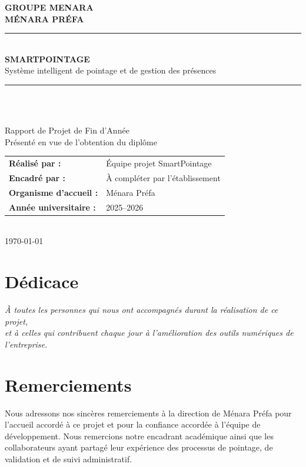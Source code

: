 \documentclass[11pt,a4paper,oneside]{report}
\newcommand{\menara}{Ménara Préfa}
\begin{document}
\begin{titlepage}
\centering
\vspace*{1.2cm}
{\Large\bfseries GROUPE MENARA}\\[0.2cm]
{\large\bfseries MÉNARA PRÉFA}\\[1.5cm]
\rule{\textwidth}{1.2pt}\\[0.5cm]
{\Huge\bfseries\textcolor{menaranavy}{SMARTPOINTAGE}}\\[0.35cm]
{\Large Système intelligent de pointage et de gestion des présences}\\[0.5cm]
\rule{\textwidth}{1.2pt}\\[1.8cm]
\\[1.8cm]
{\large Rapport de Projet de Fin d'Année}\\[0.3cm]
{\large Présenté en vue de l'obtention du diplôme}\\[1.4cm]
\begin{tabular}{>{\bfseries}p{5cm}p{7cm}}
Réalisé par : & Équipe projet SmartPointage \\
Encadré par : & À compléter par l'établissement \\
Organisme d'accueil : & Ménara Préfa \\
Année universitaire : & 2025--2026
\end{tabular}\\[1.6cm]
{\large \today}
\end{titlepage}

\chapter*{Dédicace}
\thispagestyle{empty}
\begin{center}\vspace*{3cm}\textit{À toutes les personnes qui nous ont accompagnés durant la réalisation de ce projet,\\ et à celles qui contribuent chaque jour à l'amélioration des outils numériques de l'entreprise.}\end{center}
\newpage
\chapter*{Remerciements}
Nous adressons nos sincères remerciements à la direction de \menara{} pour l'accueil accordé à ce projet et pour la confiance accordée à l'équipe de développement. Nous remercions notre encadrant académique ainsi que les collaborateurs ayant partagé leur expérience des processus de pointage, de validation et de suivi administratif.
\end{document}
